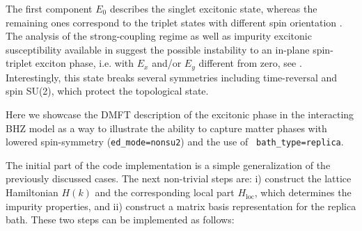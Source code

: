\documentclass[edipack_sp.tex]{subfiles}
\begin{document}
The first component $E_0$ describes the singlet excitonic state,
whereas the remaining ones correspond to the triplet states with
different spin orientation \cite{Blason,Amaricci2023PR}.   
The analysis of the strong-coupling regime as well as impurity
excitonic susceptibility available in \NAME suggest the possible
instability to an in-plane spin-triplet exciton phase, i.e. with $E_x$
and/or $E_y$ different from zero, see \cite{Amaricci2023PR}.
Interestingly, this state breaks several symmetries including
time-reversal and spin SU(2), which protect the topological state.

Here we showcase the DMFT description of the excitonic phase in the interacting BHZ model as a way to
illustrate the \NAME ability to capture matter phases with lowered spin-symmetry ({\tt ed\_mode=nonsu2}) and the use of {\tt
  bath\_type=replica}.

The initial part of the code implementation is a simple generalization of the previously discussed cases. 
The next non-trivial steps are: i) construct the lattice Hamiltonian $H(k)$ and the corresponding local part $H_\mathrm{loc}$, which determines the impurity properties, and ii) construct a matrix basis representation for the replica bath. These two steps can be implemented as follows: 
\end{document}
